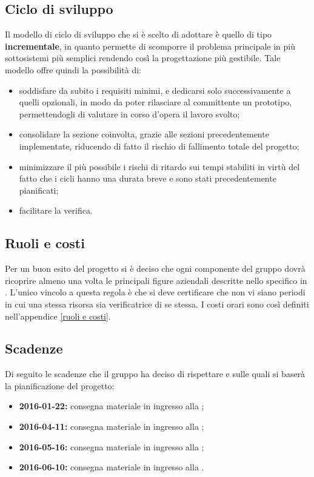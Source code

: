 \documentclass[12pt,a4paper]{article}
\begin{document}
\subsection{Ciclo di sviluppo}
Il modello di ciclo di sviluppo che si è scelto di adottare è quello di tipo \textbf{incrementale}, in quanto permette di scomporre il problema principale in più sottosistemi più semplici rendendo così la progettazione più gestibile. Tale modello offre quindi la possibilità di:
\begin{itemize}
	\item soddisfare da subito i requisiti minimi, e dedicarsi solo successivamente a quelli opzionali, in modo da poter rilasciare al committente un prototipo, permettendogli di valutare in corso d'opera il lavoro svolto;
	\item consolidare la sezione coinvolta, grazie alle sezioni precedentemente implementate, riducendo di fatto il rischio di fallimento totale del progetto;
	\item minimizzare il più possibile i rischi di ritardo sui tempi stabiliti in virtù del fatto che i cicli hanno una durata breve e sono stati precedentemente pianificati;
	\item facilitare la verifica.
\end{itemize}

\subsection{Ruoli e costi}
Per un buon esito del progetto si è deciso che ogni componente del gruppo dovrà ricoprire almeno una volta le principali figure aziendali descritte nello specifico in \NdP. L'unico vincolo a questa regola è che si deve certificare che non vi siano periodi in cui una stessa risorsa sia verificatrice di se stessa. I costi orari sono così definiti nell'appendice \ref{ruoli e costi}. 

\subsection{Scadenze}
Di seguito le scadenze che il gruppo \nomeGruppo{} ha deciso di rispettare e sulle quali si baserà la pianificazione del progetto:
\begin{itemize}
	\item \textbf{2016-01-22:} consegna materiale in ingresso alla \RR;
	\item \textbf{2016-04-11:} consegna materiale in ingresso alla \RP;
	\item \textbf{2016-05-16:} consegna materiale in ingresso alla \RQ;
	\item \textbf{2016-06-10:} consegna materiale in ingresso alla \RA.
\end{itemize}
\end{document}

